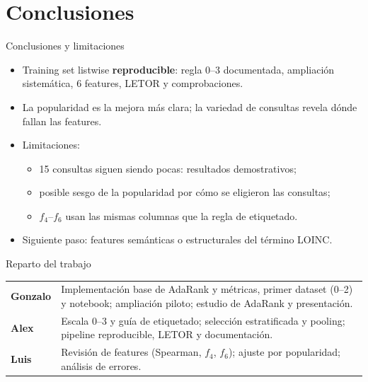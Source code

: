 \documentclass{beamer}
\begin{document}
\section{Conclusiones}

\begin{frame}{Conclusiones y limitaciones}
    \begin{itemize}
        \item Training set listwise \textbf{reproducible}: regla 0--3 documentada, ampliación sistemática, 6 features, LETOR y comprobaciones.
        \item La popularidad es la mejora más clara; la variedad de consultas revela dónde fallan las features.
        \item Limitaciones:
        \begin{itemize}
            \item 15 consultas siguen siendo pocas: resultados demostrativos;
            \item posible sesgo de la popularidad por cómo se eligieron las consultas;
            \item $f_4$--$f_6$ usan las mismas columnas que la regla de etiquetado.
        \end{itemize}
        \item Siguiente paso: features semánticas o estructurales del término LOINC.
    \end{itemize}
\end{frame}

\begin{frame}{Reparto del trabajo}
    \centering\small
    \begin{tabular}{>{\bfseries}p{2.6cm} p{7.4cm}}
        \toprule
        Gonzalo & Implementación base de AdaRank y métricas, primer dataset (0--2) y notebook;
                  ampliación piloto; estudio de AdaRank y presentación. \\
        \addlinespace
        Alex & Escala 0--3 y guía de etiquetado; selección estratificada y pooling;
               pipeline reproducible, LETOR y documentación. \\
        \addlinespace
        Luis & Revisión de features (Spearman, $f_4$, $f_6$); ajuste por popularidad;
               análisis de errores. \\
        \bottomrule
    \end{tabular}
\end{frame}
\end{document}
